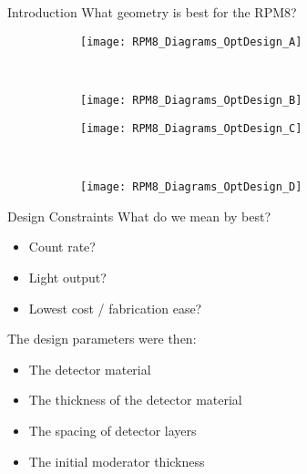 \documentclass[compress]{beamer}
\begin{document}
\subsection*{}
\begin{frame}{Introduction}
What geometry is best for the RPM8?
\begin{figure}
    \centering
    \begin{subfigure}[b]{0.25\textwidth}
        \texttt{[image: RPM8\_Diagrams\_OptDesign\_A]}
    \end{subfigure}
    ~
    \begin{subfigure}[b]{0.25\textwidth}
        \texttt{[image: RPM8\_Diagrams\_OptDesign\_B]}
    \end{subfigure}

    \begin{subfigure}[b]{0.25\textwidth}
        \texttt{[image: RPM8\_Diagrams\_OptDesign\_C]}
    \end{subfigure}
    ~
    \begin{subfigure}[b]{0.25\textwidth}
        \texttt{[image: RPM8\_Diagrams\_OptDesign\_D]}
    \end{subfigure}
    \label{fig:OptDesignSchematics}
\end{figure}
\end{frame}
\begin{frame}{Design Constraints}
What do we mean by best?
\begin{itemize}
	\small
  \item Count rate? 
  \item Light output?
	\item Lowest cost / fabrication ease?
\end{itemize}
The design parameters were then:
\begin{itemize}
	\small
  \item The detector material
  \item The thickness of the detector material
  \item The spacing of detector layers
  \item The initial moderator thickness
\end{itemize}
\end{frame}
\end{document}
